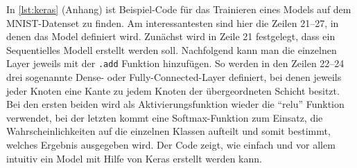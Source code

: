 In \autoref{lst:keras} (Anhang) ist Beispiel-Code für das Trainieren eines Models auf dem MNIST-Datenset zu finden. Am interessantesten sind hier die Zeilen 21--27, in denen das Model definiert wird. Zunächst wird in Zeile 21 festgelegt, dass ein Sequentielles Modell erstellt werden soll. Nachfolgend kann man die einzelnen Layer jeweils mit der \lstinline$.add$ Funktion hinzufügen. So werden in den Zeilen 22--24 drei sogenannte Dense- oder Fully-Connected-Layer definiert, bei denen jeweils jeder Knoten eine Kante zu jedem Knoten der übergeordneten Schicht besitzt. Bei den ersten beiden wird als Aktivierungsfunktion wieder die "`relu"' Funktion verwendet, bei der letzten kommt eine Softmax-Funktion zum Einsatz, die Wahrscheinlichkeiten auf die einzelnen Klassen aufteilt und somit bestimmt, welches Ergebnis ausgegeben wird. Der Code zeigt, wie einfach und vor allem intuitiv ein Model mit Hilfe von Keras erstellt werden kann.